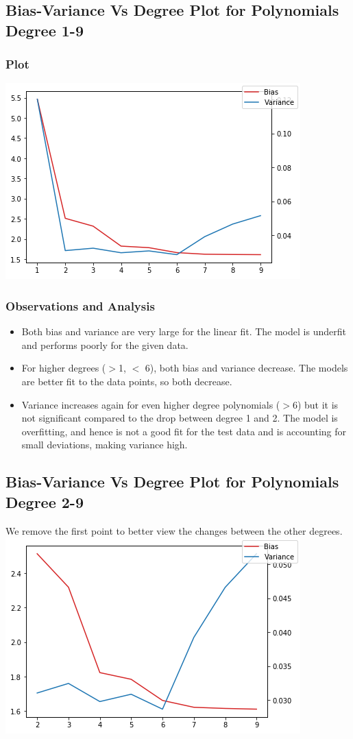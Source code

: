 \documentclass{article}
\begin{document}
\subsection{Bias-Variance Vs Degree Plot for Polynomials Degree 1-9}
\subsubsection{Plot}
\includegraphics[scale=.9]{images/1-9.png}
\subsubsection{Observations and Analysis}
\begin{itemize}
\item Both bias and variance are very large for the linear fit. The model is underfit and performs poorly for the given data.
\item For higher degrees ($>$1, $<$ 6), both bias and variance decrease. The models are better fit to the data points, so both decrease.
\item Variance increases again for even higher degree polynomials ($>$6) but it is not significant compared to the drop between degree  1 and 2. The model is overfitting, and hence is not a good fit for the test data and is accounting for small deviations, making variance high.
\end{itemize}
\subsection{Bias-Variance Vs Degree Plot for Polynomials Degree 2-9}
We remove the first point to better view the changes between the other degrees.
\includegraphics[scale=.9]{images/2-9.png}
\end{document}
